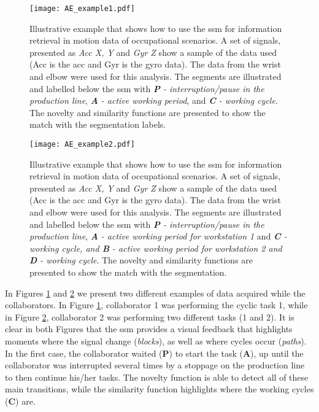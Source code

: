 \begin{figure}
  \centering
      \texttt{[image: AE\_example1.pdf]}
  \caption{Illustrative example that shows how to use the \gls{ssm} for information retrieval in motion data of occupational scenarios. A set of signals, presented as \textit{Acc X, Y} and \textit{Gyr Z} show a sample of the data used (Acc is the \gls{acc} and Gyr is the \gls{gyro} data). The data from the wrist and elbow were used for this analysis. The segments are illustrated and labelled below the \gls{ssm} with \textit{\textbf{P} - interruption/pause in the production line}, \textit{\textbf{A} - active working period}, and \textit{\textbf{C} - working cycle}. The novelty and similarity functions are presented to show the match with the segmentation labels.}
  \label{fig:ae_example1}
\end{figure}

\begin{figure}
  \centering
      \texttt{[image: AE\_example2.pdf]}
  \caption{Illustrative example that shows how to use the \gls{ssm} for information retrieval in motion data of occupational scenarios. A set of signals, presented as \textit{Acc X, Y} and \textit{Gyr Z} show a sample of the data used (Acc is the \gls{acc} and Gyr is the \gls{gyro} data). The data from the wrist and elbow were used for this analysis. The segments are illustrated and labelled below the \gls{ssm} with \textit{\textbf{P} - interruption/pause in the production line}, \textit{\textbf{A} - active working period for workstation 1} and \textit{\textbf{C} - working cycle, and \textbf{B} - active working period for workstation 2 and \textbf{D} - working cycle}. The novelty and similarity functions are presented to show the match with the segmentation.}
  \label{fig:ae_example2}
\end{figure}

In Figures \ref{fig:ae_example1} and \ref{fig:ae_example2} we present two different examples of data acquired while the collaborators. In Figure \ref{fig:ae_example1}, collaborator 1 was performing the cyclic task 1, while in Figure \ref{fig:ae_example2}, collaborator 2 was performing two different tasks (1 and 2). It is clear in both Figures that the \gls{ssm} provides a visual feedback that highlights moments where the signal change (\textit{blocks}), as well as where cycles occur (\textit{paths}). In the first case, the collaborator waited (\textbf{P}) to start the task (\textbf{A}), up until the collaborator was interrupted several times by a stoppage on the production line to then continue his/her tasks. The novelty function is able to detect all of these main transitions, while the similarity function highlights where the working cycles (\textbf{C}) are.


